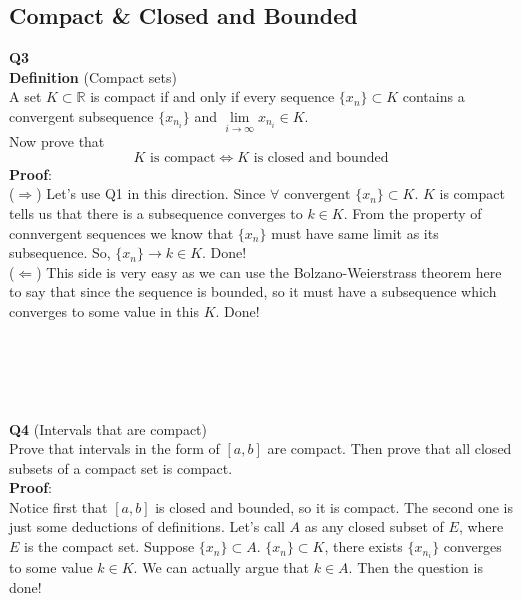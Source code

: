 \documentclass{article}
\newcommand{\tb}[1]{\textbf{#1}}
\begin{document}
\subsection{Compact \& Closed and Bounded}
\tb{Q3}\\
\tb{Definition} (Compact sets)\\
A set $K \subset \mathbb{R}$ is compact if and only if every sequence $\{x_n\} \subset K$ contains a convergent subsequence $\{x_{n_i}\}$ and $\lim\limits_{i \to \infty} x_{n_i} \in K$.\\
Now prove that 
$$
K \text{ is compact} \Leftrightarrow K \text{ is closed and bounded}
$$
\tb{Proof}:\\
($\Longrightarrow$) Let's use Q1 in this direction. Since $\forall \text{  convergent } \{x_n\} \subset K$. $K$ is compact tells us that there is a subsequence converges to $k \in K$. From 
the property of connvergent sequences we know that $\{x_n\}$ must have same limit as its subsequence. So, $\{x_n\} \rightarrow k \in K$. Done!\\
($\Longleftarrow$) This side is very easy as we can use the Bolzano-Weierstrass theorem here to say that since the sequence is bounded, so it must have a subsequence which converges to some 
value in this $K$. Done!\\
\\
\\
\\
\\
\\
\tb{Q4} (Intervals that are compact)\\
Prove that intervals in the form of $\left[a , b\right]$ are compact. Then prove that all closed subsets of a compact set is compact.\\
\tb{Proof}:\\
Notice first that $\left[a, b\right]$ is closed and bounded, so it is compact. The second one is just some deductions of definitions. Let's call $A$ as any closed subset of $E$, where $E$ is the
compact set. Suppose $\{x_n\} \subset A$. $\{x_n\} \subset K$, there exists $\{x_{n_i}\}$ converges to some value $k \in K$. We can actually argue that $k \in A$. Then the question is done!\\
\\
\\
\\
\\
\\
\end{document}
